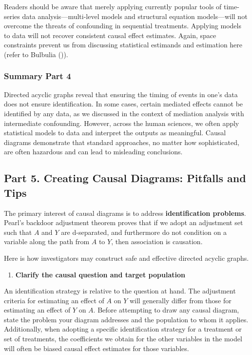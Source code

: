 \documentclass[
  single column]{article}
\providecommand{\tightlist}{%
  \setlength{\itemsep}{0pt}\setlength{\parskip}{0pt}}\usepackage{longtable,booktabs,array}
\begin{document}
Readers should be aware that merely applying currently popular tools of
time-series data analysis---multi-level models and structural equation
models---will not overcome the threats of confounding in sequential
treatments. Applying models to data will not recover consistent causal
effect estimates. Again, space constraints prevent us from discussing
statistical estimands and estimation here (refer to Bulbulia
()).

\subsubsection{Summary Part 4}\label{summary-part-4}

Directed acyclic graphs reveal that ensuring the timing of events in
one's data does not ensure identification. In some cases, certain
mediated effects cannot be identified by any data, as we discussed in
the context of mediation analysis with intermediate confounding.
However, across the human sciences, we often apply statistical models to
data and interpret the outputs as meaningful. Causal diagrams
demonstrate that standard approaches, no matter how sophisticated, are
often hazardous and can lead to misleading conclusions.

\subsection{Part 5. Creating Causal Diagrams: Pitfalls and
Tips}\label{id-sec-5}

The primary interest of causal diagrams is to address
\textbf{identification problems}. Pearl's backdoor adjustment theorem
proves that if we adopt an adjustment set such that \(A\) and \(Y\) are
d-separated, and furthermore do not condition on a variable along the
path from \(A\) to \(Y\), then association is causation.

Here is how investigators may construct safe and effective directed
acyclic graphs.

\begin{enumerate}
\def\labelenumi{\arabic{enumi}.}
\tightlist
\item
  \textbf{Clarify the causal question and target population}
\end{enumerate}

An identification strategy is relative to the question at hand. The
adjustment criteria for estimating an effect of \(A\) on \(Y\) will
generally differ from those for estimating an effect of \(Y\) on \(A\).
Before attempting to draw any causal diagram, state the problem your
diagram addresses and the population to whom it applies. Additionally,
when adopting a specific identification strategy for a treatment or set
of treatments, the coefficients we obtain for the other variables in the
model will often be biased causal effect estimates for those variables.
\end{document}
